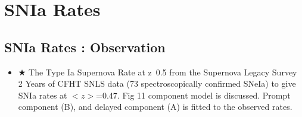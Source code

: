 \section{SNIa Rates}
\subsection{SNIa Rates : Observation}
\begin{itemize}
\item $\bigstar$ The Type Ia Supernova Rate at z~0.5 from the Supernova Legacy Survey
\citep[][\#76:4/30/10,neill06a]{neill06a}\\
2 Years of CFHT SNLS data (73 spectroscopically confirmed SNeIa) to give SNIa rates
at $<z>$=0.47. Fig 11 component model is discussed. Prompt component (B), and delayed
component (A) is fitted to the observed rates.
\end{itemize}

